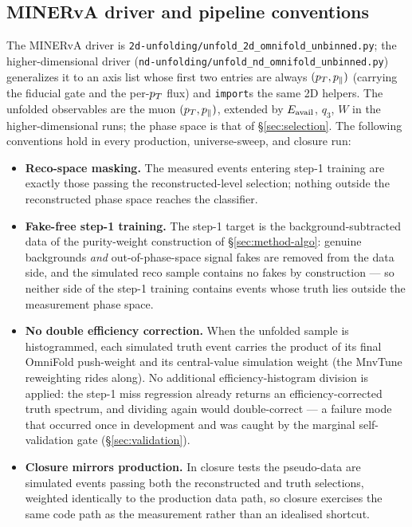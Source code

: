 \subsection{MINERvA driver and pipeline conventions}
\label{sec:method-driver}



The MINERvA driver is \texttt{2d-unfolding/unfold\_2d\_omnifold\_unbinned.py};
the higher-dimensional driver
(\texttt{nd-unfolding/unfold\_nd\_omnifold\_unbinned.py}) generalizes it to an
axis list whose first two entries are always $(p_{T},p_{\parallel})$ (carrying the
fiducial gate and the per-$p_{T}$ flux) and \texttt{import}s the same 2D
helpers. The unfolded observables are the muon $(p_{T},p_{\parallel})$, extended by
$E_{\mathrm{avail}}$, $q_{3}$, $W$ in the higher-dimensional runs; the phase space is
that of \S\ref{sec:selection}. The following conventions hold in every
production, universe-sweep, and closure run:


\begin{itemize}[itemsep=2pt]
  \item \textbf{Reco-space masking.} The measured events entering step-1
        training are exactly those passing the reconstructed-level
        selection; nothing outside the reconstructed phase space reaches the
        classifier.
  \item \textbf{Fake-free step-1 training.} The step-1 target is the
        background-subtracted data of the purity-weight construction of
        \S\ref{sec:method-algo}: genuine backgrounds \emph{and}
        out-of-phase-space signal fakes are removed from the data side, and
        the simulated reco sample contains no fakes by construction --- so
        neither side of the step-1 training contains events whose truth lies
        outside the measurement phase space.
  \item \textbf{No double efficiency correction.} When the unfolded sample
        is histogrammed, each simulated truth event carries the product of
        its final OmniFold push-weight and its central-value simulation
        weight (the MnvTune reweighting rides along). No additional
        efficiency-histogram division is applied: the step-1 miss regression
        already returns an efficiency-corrected truth spectrum, and dividing
        again would double-correct --- a failure mode that occurred once in
        development and was caught by the marginal self-validation gate
        (\S\ref{sec:validation}).
  \item \textbf{Closure mirrors production.} In closure tests the
        pseudo-data are simulated events passing both the reconstructed and
        truth selections, weighted identically to the production data path,
        so closure exercises the same code path as the measurement rather
        than an idealised shortcut.
\end{itemize}

